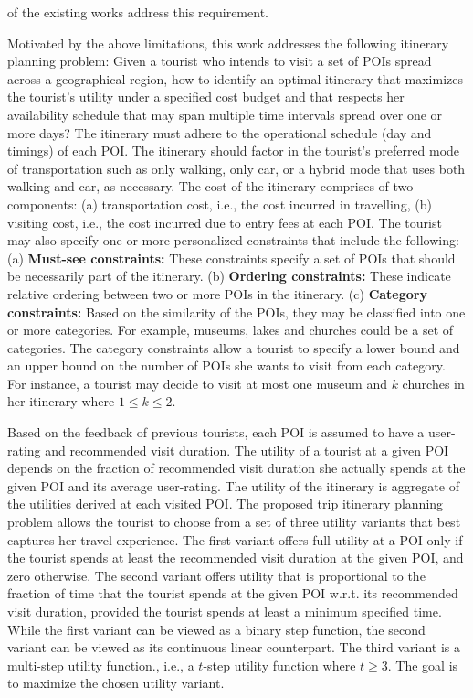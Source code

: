 \documentclass[sigconf,authordraft]{acmart}
\begin{document}
of the existing works address this requirement.

Motivated by the above limitations, this work addresses the following itinerary planning problem: Given a tourist who intends to visit a set of POIs spread across a geographical region, how to  identify an optimal itinerary that maximizes the tourist's utility under a specified cost budget and that respects her availability schedule that may span multiple time intervals spread over one or more days? The itinerary must adhere to the operational schedule (day and timings) of each POI. The itinerary should factor in the tourist's preferred mode of transportation such as only walking, only car, or a hybrid mode that uses both walking and car, as necessary. The cost of the itinerary comprises of two components: (a) transportation cost, i.e., the cost incurred in travelling, (b) visiting cost, i.e., the cost incurred due to entry fees at each POI. The tourist may also specify one or more personalized constraints that include the following: (a) \textbf{Must-see constraints:} These constraints specify a set of POIs that should be necessarily part of the itinerary. (b) \textbf{Ordering constraints:} These indicate relative ordering between two or more POIs in the itinerary. (c) \textbf{Category constraints:} Based on the similarity of the POIs, they may be classified into one or more categories. For example, museums, lakes and churches could be a set of categories.  The category constraints allow a tourist to specify a lower bound and an upper bound on the number of POIs she wants to visit from each category. For instance, a tourist may decide to visit at most one museum and $k$ churches in her itinerary where $1 \le k \le 2$. 

Based on the feedback of previous tourists, each POI is assumed to have a user-rating and recommended visit duration. The utility of a tourist at a given POI depends on the fraction of recommended visit duration she actually spends at the given POI and its average user-rating. The utility of the itinerary is aggregate of the utilities derived at each visited POI. The proposed trip itinerary planning problem allows the tourist to choose from a set of three utility variants that best captures her travel experience. The first variant offers full utility at a POI only if the tourist spends at least the recommended visit duration at the given POI, and zero otherwise. The second variant offers utility that is proportional to the fraction of time that the tourist spends at the given POI w.r.t. its recommended visit duration, provided the tourist  spends at least a minimum specified time. While the first variant can be viewed as a binary step function, the second variant can be viewed as its continuous linear counterpart. The third variant is a multi-step utility function., i.e., a $t$-step utility function where $t \ge 3$. The goal is to maximize the chosen utility variant.
\end{document}
